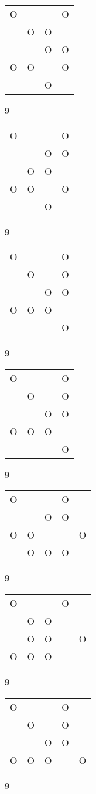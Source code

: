 \begin{tabular}{|m{0.2cm}m{0.2cm}m{0.2cm}m{0.2cm}|}\hline
O& & &O\\
 &O&O& \\
 & &O&O\\
O&O& &O\\
 & &O& \\
\hline\end{tabular}9
\begin{tabular}{|m{0.2cm}m{0.2cm}m{0.2cm}m{0.2cm}|}\hline
O& & &O\\
 & &O&O\\
 &O&O& \\
O&O& &O\\
 & &O& \\
\hline\end{tabular}9
\begin{tabular}{|m{0.2cm}m{0.2cm}m{0.2cm}m{0.2cm}|}\hline
O& & &O\\
 &O& &O\\
 & &O&O\\
O&O&O& \\
 & & &O\\
\hline\end{tabular}9
\begin{tabular}{|m{0.2cm}m{0.2cm}m{0.2cm}m{0.2cm}|}\hline
O& & &O\\
 &O& &O\\
 & &O&O\\
O&O&O& \\
 & & &O\\
\hline\end{tabular}9
\begin{tabular}{|m{0.2cm}m{0.2cm}m{0.2cm}m{0.2cm}m{0.2cm}|}\hline
O& & &O& \\
 & &O&O& \\
O&O& & &O\\
 &O&O&O& \\
\hline\end{tabular}9
\begin{tabular}{|m{0.2cm}m{0.2cm}m{0.2cm}m{0.2cm}m{0.2cm}|}\hline
O& & &O& \\
 &O&O& & \\
 &O&O& &O\\
O&O&O& & \\
\hline\end{tabular}9
\begin{tabular}{|m{0.2cm}m{0.2cm}m{0.2cm}m{0.2cm}m{0.2cm}|}\hline
O& & &O& \\
 &O& &O& \\
 & &O&O& \\
O&O&O& &O\\
\hline\end{tabular}9
